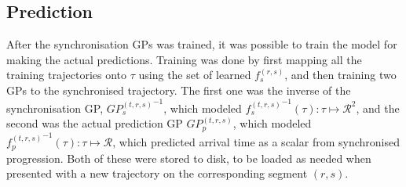 \subsection{Prediction}
After the synchronisation GPs was trained, it was possible to train the model for making the actual predictions. Training was done by first mapping all the training trajectories onto $\tau$ using the set of learned  $f^{(r,s)}_s$, and then training two GPs to the synchronised trajectory. The first one was the inverse of the synchronisation GP, ${GP_s^{(t, r,s)}}^{-1}$, which modeled ${f^{(t, r,s)}_s}^{-1}(\tau) : \tau \mapsto \mathcal{R}^2$, and the second was the actual prediction GP $GP_p^{(t,r,s)}$, which modeled ${f^{(t,r,s)}_p}^{-1}(\tau) : \tau \mapsto \mathcal{R}$, which predicted arrival time as a scalar from synchronised progression. Both of these were stored to disk, to be loaded as needed when presented with a new trajectory on the corresponding segment $(r, s)$.

